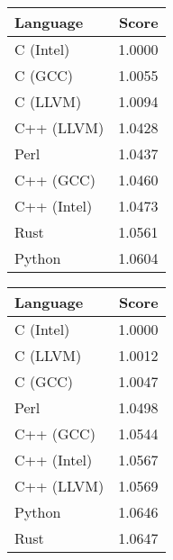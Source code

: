 \begin{subtable}{0.33\textwidth}
    \centering
    \caption{$k=3$}
    \label{table:energy:regexp(3)}
    \begin{tabular}{|l|r|}
        \hline
        Language & Score \\
        \hline
        C (Intel) & 1.0000 \\
        C (GCC) & 1.0055 \\
        C (LLVM) & 1.0094 \\
        C++ (LLVM) & 1.0428 \\
        Perl & 1.0437 \\
        C++ (GCC) & 1.0460 \\
        C++ (Intel) & 1.0473 \\
        Rust & 1.0561 \\
        Python & 1.0604 \\
        \hline
    \end{tabular}
\end{subtable}
\begin{subtable}{0.33\textwidth}
    \centering
    \caption{$k=4$}
    \label{table:energy:regexp(4)}
    \begin{tabular}{|l|r|}
        \hline
        Language & Score \\
        \hline
        C (Intel) & 1.0000 \\
        C (LLVM) & 1.0012 \\
        C (GCC) & 1.0047 \\
        Perl & 1.0498 \\
        C++ (GCC) & 1.0544 \\
        C++ (Intel) & 1.0567 \\
        C++ (LLVM) & 1.0569 \\
        Python & 1.0646 \\
        Rust & 1.0647 \\
        \hline
    \end{tabular}
\end{subtable}%
